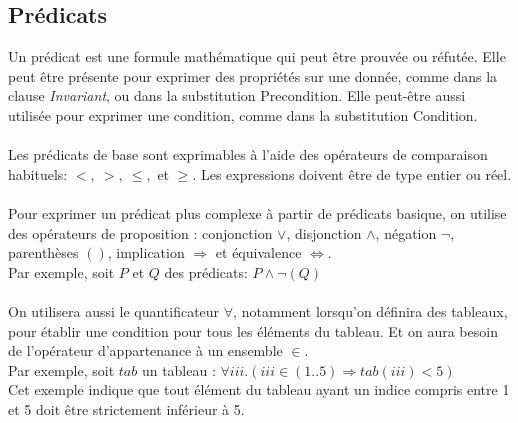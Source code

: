 \subsection{Prédicats}

Un prédicat est une formule mathématique qui peut être prouvée ou
réfutée. Elle peut être présente pour exprimer des propriétés sur une
donnée, comme dans la clause \emph{Invariant}, ou dans la substitution
Precondition. Elle peut-être aussi utilisée pour exprimer une
condition, comme dans la substitution Condition.

\paragraph{}
Les prédicats de base sont exprimables à l'aide des opérateurs de
comparaison habituels: $<,~>,~\leq,$ et $\geq$. Les expressions doivent
être de type entier ou réel.

\paragraph{}
Pour exprimer un prédicat plus complexe à partir de prédicats basique,
on utilise des opérateurs de proposition : conjonction $\vee$,
disjonction $\wedge$, négation $\neg$, parenthèses $()$, implication
$\Rightarrow$ et équivalence $\Leftrightarrow$.\\
Par exemple, soit $P$ et $Q$ des prédicats: $P\wedge\neg(Q)$

\paragraph{}
On utilisera aussi le quantificateur $\forall$, notamment lorsqu'on
définira des tableaux, pour établir une condition pour tous les
éléments du tableau. Et on aura besoin de l'opérateur d'appartenance à
un ensemble $\in$.\\
Par exemple, soit $tab$ un tableau : $\forall iii . (iii \in (1..5)
\Rightarrow tab(iii) < 5)$\\
Cet exemple indique que tout élément du tableau ayant un indice compris
entre 1 et 5 doit être strictement inférieur à 5. 




